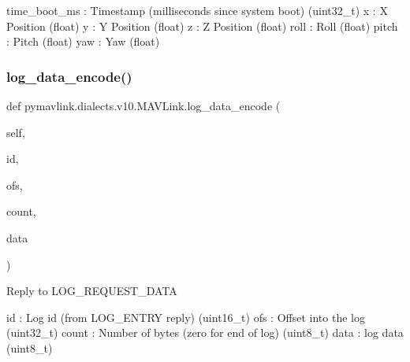 \begin{DoxyVerb}
\begin{DoxyVerb}
\begin{DoxyVerb}
\begin{DoxyVerb}
\begin{DoxyVerb}
time_boot_ms              : Timestamp (milliseconds since system boot) (uint32_t)
x                         : X Position (float)
y                         : Y Position (float)
z                         : Z Position (float)
roll                      : Roll (float)
pitch                     : Pitch (float)
yaw                       : Yaw (float)\end{DoxyVerb}
 \mbox{\label{classpymavlink_1_1dialects_1_1v10_1_1MAVLink_abf72df1eed5d0c8715720c2bd14c33c7}} 
\subsubsection{\texorpdfstring{log\+\_\+data\+\_\+encode()}{log\_data\_encode()}}
{\footnotesize\ttfamily def pymavlink.\+dialects.\+v10.\+M\+A\+V\+Link.\+log\+\_\+data\+\_\+encode (\begin{DoxyParamCaption}\item[{}]{self,  }\item[{}]{id,  }\item[{}]{ofs,  }\item[{}]{count,  }\item[{}]{data }\end{DoxyParamCaption})}

\begin{DoxyVerb}Reply to LOG_REQUEST_DATA

id                        : Log id (from LOG_ENTRY reply) (uint16_t)
ofs                       : Offset into the log (uint32_t)
count                     : Number of bytes (zero for end of log) (uint8_t)
data                      : log data (uint8_t)\end{DoxyVerb}
 \mbox{\label{classpymavlink_1_1dialects_1_1v10_1_1MAVLink_ad56e75fea074bab726d216c0168854ac}} 

\end{DoxyVerb}
\end{DoxyVerb}
\end{DoxyVerb}
\end{DoxyVerb}
